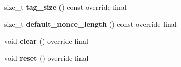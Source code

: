 \begin{DoxyCompactItemize}
size\+\_\+t {\bfseries tag\+\_\+size} () const override final
\item 
\mbox{\label{class_botan_1_1_t_l_s_1_1_t_l_s___c_b_c___h_m_a_c___a_e_a_d___mode_ae8d95954800f5c22327af01924dec1b3}} 
size\+\_\+t {\bfseries default\+\_\+nonce\+\_\+length} () const override final
\item 
\mbox{\label{class_botan_1_1_t_l_s_1_1_t_l_s___c_b_c___h_m_a_c___a_e_a_d___mode_ae3128cee7cdc251f17da156652237b8d}} 
void {\bfseries clear} () override final
\item 
\mbox{\label{class_botan_1_1_t_l_s_1_1_t_l_s___c_b_c___h_m_a_c___a_e_a_d___mode_a768d4fa2e7dc766053d70674703712ac}} 
void {\bfseries reset} () override final
\end{DoxyCompactItemize}
